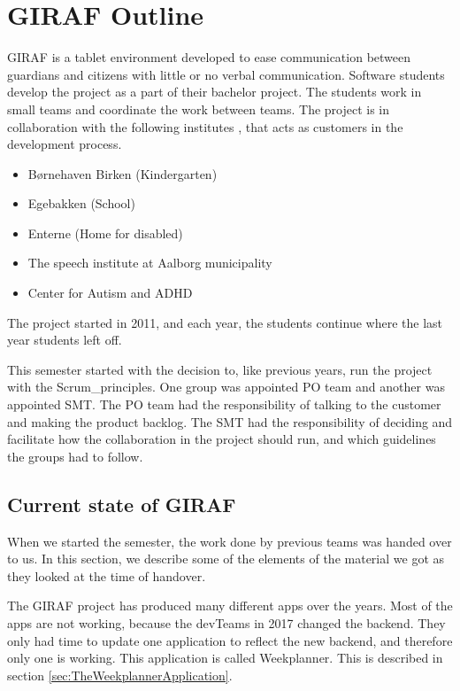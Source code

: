\chapter{GIRAF Outline}

GIRAF is a tablet environment developed to ease communication between \glspl{guardian} and \glspl{citizen} with little or no verbal communication. Software students develop the project as a part of their bachelor project. The students work in small teams and coordinate the work between teams. The project is in collaboration with the following institutes \cite{GirafWebsite}, that acts as customers in the development process.

\begin{itemize}
    \item Børnehaven Birken (Kindergarten) \cite{bhBirken}
    \item Egebakken (School) \cite{egebakken}
    \item Enterne (Home for disabled) \cite{enterne}
    \item The speech institute at Aalborg municipality
    \item Center for Autism and ADHD \cite{center_for_autism}
\end{itemize}

The project started in 2011, and each year, the students continue where the last year students left off.

This semester started with the decision to, like previous years, run the project with the \gls{Scrum_principles}. One group was appointed \gls{PO} team and another was appointed \gls{SMT}. The \gls{PO} team had the responsibility of talking to the customer and making the product backlog. The \gls{SMT} had the responsibility of deciding and facilitate how the collaboration in the project should run, and which guidelines the groups had to follow.

\section{Current state of GIRAF}

When we started the semester, the work done by previous teams was handed over to us. In this section, we describe some of the elements of the material we got as they looked at the time of handover.

The GIRAF project has produced many different apps over the years. Most of the apps are not working, because the \glspl{devTeam} in 2017 changed the backend. They only had time to update one application to reflect the new backend, and therefore only one is working. This application is called Weekplanner. This is described in section \ref{sec:TheWeekplannerApplication}.

